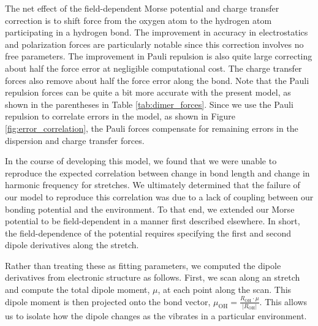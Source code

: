 \documentclass[12pt,letter]{article}
\begin{document}
The net effect of the field-dependent Morse potential and charge transfer correction is to shift force from the oxygen atom to the hydrogen atom participating in a hydrogen bond. The improvement in accuracy in electrostatics and polarization forces are particularly notable since this correction involves no free parameters. The improvement in Pauli repulsion is also quite large correcting about half the force error at negligible computational cost. The charge transfer forces also remove about half the force error along the  bond. Note that the Pauli repulsion forces can be quite a bit more accurate with the present model, as shown in the parentheses in Table \ref{tab:dimer_forces}. Since we use the Pauli repulsion to correlate errors in the model, as shown in Figure \ref{fig:error_correlation}, the Pauli forces compensate for remaining errors in the dispersion and charge transfer forces.


In the course of developing this model, we found that we were unable to reproduce the
expected correlation between change in bond length and change in harmonic frequency
for  stretches.\cite{boyer2019beyond} We ultimately determined that the failure
of our model to reproduce this correlation was due to a lack of coupling between
our bonding potential and the environment. To that end, we extended our Morse potential
to be field-dependent in a manner first described elsewhere.\cite{boyer2019beyond} In short,
the field-dependence of the potential requires specifying the first and second dipole
derivatives along the  stretch.

Rather than treating these as fitting parameters, we computed the dipole derivatives
from electronic structure as follows. First, we scan along an  stretch
and compute the total dipole moment, $\mu$, at each point along the scan. This dipole
moment is then projected onto the  bond vector,
$\mu_{\mathrm{OH}}=\frac{R_{\mathrm{OH}}\cdot \mu}{|R_{\mathrm{OH}}|}$. This allows
us to isolate how the dipole changes as the  vibrates in a particular environment.
\end{document}
